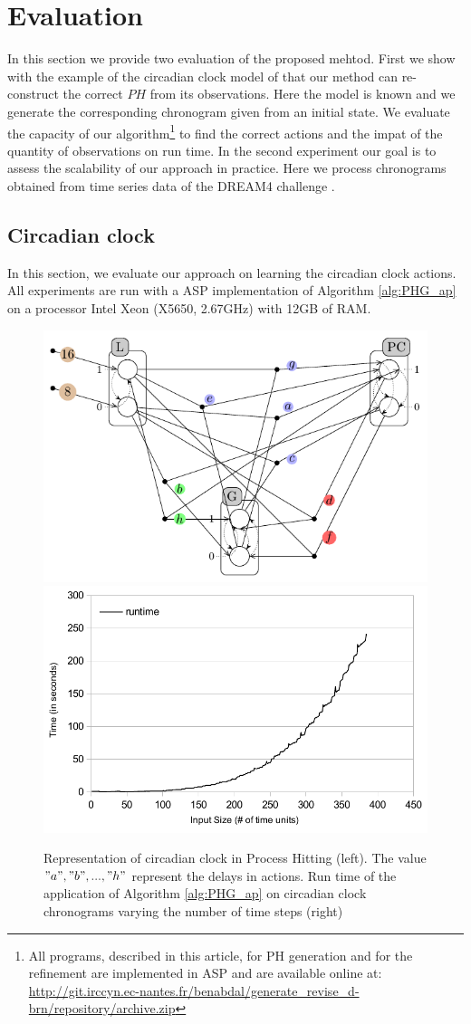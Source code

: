 \section{Evaluation}

In this section we provide two evaluation of the proposed mehtod.
First we show with the example of the circadian clock model of \cite{comet2012simplified} that our method can re-construct the correct $PH$ from its observations.
Here the model is known and we generate the corresponding chronogram given from an initial state.
We evaluate the capacity of our algorithm\footnote{All programs, described in this article, for PH generation and for the refinement are implemented in ASP and are available online at: \url{http://git.irccyn.ec-nantes.fr/benabdal/generate_revise_d-brn/repository/archive.zip}} to find the correct actions and the impat of the quantity of observations on run time.
In the second experiment our goal is to assess the scalability of our approach in practice.
Here we process chronograms obtained from time series data of the DREAM4 challenge .

\label{sec:evaluation}
\subsection{Circadian clock}

In this section, we evaluate our approach on learning the circadian clock actions.
All experiments are run with a ASP implementation of Algorithm \ref{alg:PHG_ap} on a processor Intel Xeon (X5650, 2.67GHz) with 12GB of RAM.

	\begin{figure}[htb!]\centering
	\includegraphics[width=0.45\linewidth]{images/circadianPH.pdf}
	\hspace{0.1cm}
	\includegraphics[width=0.45\linewidth]{images/circadian_run_time}
	\label{fig:PH_circadian}
	\caption{Representation of circadian clock in Process Hitting (left). The value $"a", "b", ..., "h"$ represent the delays in actions.
	Run time of the application of Algorithm \ref{alg:PHG_ap} on circadian clock chronograms varying the number of time steps (right)}
	
	\label{fig:run_time}	
	\end{figure}
%

